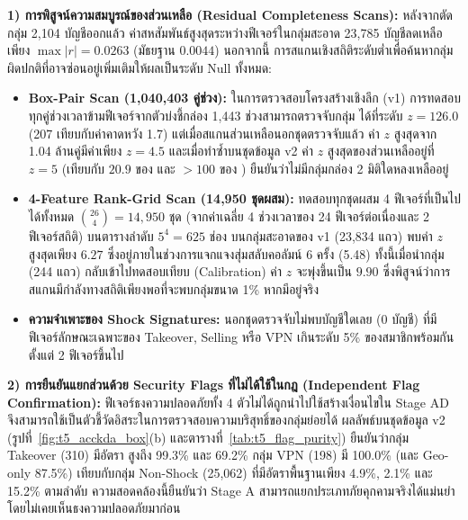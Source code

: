 \textbf{1) การพิสูจน์ความสมบูรณ์ของส่วนเหลือ (Residual Completeness Scans):}
หลังจากตัดกลุ่ม 2,104 บัญชีออกแล้ว ค่าสหสัมพันธ์สูงสุดระหว่างฟีเจอร์ในกลุ่มสะอาด 23,785 บัญชีลดเหลือเพียง $\max |r| = 0.0263$ (มัธยฐาน $0.0044$) นอกจากนี้ การสแกนเชิงสถิติระดับต่ำเพื่อค้นหากลุ่มผิดปกติที่อาจซ่อนอยู่เพิ่มเติมให้ผลเป็นระดับ Null ทั้งหมด:
\begin{itemize}
  \item \textbf{Box-Pair Scan (1,040,403 คู่ช่วง):} ในการตรวจสอบโครงสร้างเชิงลึก (v1) การทดสอบทุกคู่ช่วงเวลาข้ามฟีเจอร์จากตัวบ่งชี้กล่อง 1,443 ช่วงสามารถตรวจจับกลุ่ม  ได้ที่ระดับ $z = 126.0$ (207 เทียบกับค่าคาดหวัง 1.7) แต่เมื่อสแกนส่วนเหลือนอกชุดตรวจจับแล้ว ค่า $z$ สูงสุดจาก 1.04 ล้านคู่มีค่าเพียง $z = 4.5$ และเมื่อทำซ้ำบนชุดข้อมูล v2 ค่า $z$ สูงสุดของส่วนเหลืออยู่ที่ $z = 5$ (เทียบกับ $20.9$ ของ  และ $> 100$ ของ ) ยืนยันว่าไม่มีกลุ่มกล่อง 2 มิติใดหลงเหลืออยู่
  \item \textbf{4-Feature Rank-Grid Scan (14,950 ชุดผสม):} ทดสอบทุกชุดผสม 4 ฟีเจอร์ที่เป็นไปได้ทั้งหมด $\binom{26}{4} = 14{,}950$ ชุด (จากค่าเฉลี่ย 4 ช่วงเวลาของ 24 ฟีเจอร์ต่อเนื่องและ 2 ฟีเจอร์สถิติ) บนตารางลำดับ $5^4 = 625$ ช่อง บนกลุ่มสะอาดของ v1 (23,834 แถว) พบค่า $z$ สูงสุดเพียง $6.27$ ซึ่งอยู่ภายในช่วงการแจกแจงสุ่มสลับคอลัมน์ 6 ครั้ง (5.48) ทั้งนี้เมื่อนำกลุ่ม  (244 แถว) กลับเข้าไปทดสอบเทียบ (Calibration) ค่า $z$ จะพุ่งขึ้นเป็น $9.90$ ซึ่งพิสูจน์ว่าการสแกนมีกำลังทางสถิติเพียงพอที่จะพบกลุ่มขนาด 1\% หากมีอยู่จริง
  \item \textbf{ความจำเพาะของ Shock Signatures:} นอกชุดตรวจจับไม่พบบัญชีใดเลย (0 บัญชี) ที่มีฟีเจอร์ลักษณะเฉพาะของ Takeover, Selling หรือ VPN เกินระดับ 5\% ของสมาชิกพร้อมกันตั้งแต่ 2 ฟีเจอร์ขึ้นไป
\end{itemize}

\textbf{2) การยืนยันแยกส่วนด้วย Security Flags ที่ไม่ได้ใช้ในกฎ (Independent Flag Confirmation):}
ฟีเจอร์ธงความปลอดภัยทั้ง 4 ตัวไม่ได้ถูกนำไปใช้สร้างเงื่อนไขใน Stage A\textendash D จึงสามารถใช้เป็นตัวชี้วัดอิสระในการตรวจสอบความบริสุทธิ์ของกลุ่มย่อยได้ ผลลัพธ์บนชุดข้อมูล v2 (รูปที่~\ref{fig:t5_acckda_box}(b) และตารางที่~\ref{tab:t5_flag_purity}) ยืนยันว่ากลุ่ม Takeover (310) มีอัตรา  สูงถึง 99.3\% และ  69.2\% กลุ่ม VPN (198) มี  100.0\% (และ Geo-only 87.5\%) เทียบกับกลุ่ม Non-Shock (25,062) ที่มีอัตราพื้นฐานเพียง 4.9\%, 2.1\% และ 15.2\% ตามลำดับ ความสอดคล้องนี้ยืนยันว่า Stage A สามารถแยกประเภทภัยคุกคามจริงได้แม่นยำโดยไม่เคยเห็นธงความปลอดภัยมาก่อน


